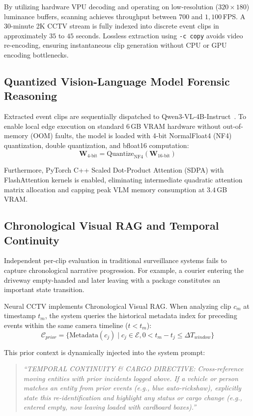 \documentclass[10pt, conference]{IEEEtran}
\begin{document}
By utilizing hardware VPU decoding and operating on low-resolution ($320 \times 180$) luminance buffers, scanning achieves throughput between $700$ and $1,100$\,FPS. A 30-minute 2K CCTV stream is fully indexed into discrete event clips in approximately $35$ to $45$ seconds. Lossless extraction using \texttt{-c copy} avoids video re-encoding, ensuring instantaneous clip generation without CPU or GPU encoding bottlenecks.

\subsection{Quantized Vision-Language Model Forensic Reasoning}
Extracted event clips are sequentially dispatched to Qwen3-VL-4B-Instruct~\cite{bai2023qwen}. To enable local edge execution on standard 6\,GB VRAM hardware without out-of-memory (OOM) faults, the model is loaded with 4-bit NormalFloat4 (NF4) quantization, double quantization, and bfloat16 computation:
\begin{equation}
\label{eq:quant}
\mathbf{W}_{4\text{-bit}} = \text{Quantize}_{\text{NF4}}(\mathbf{W}_{16\text{-bit}})
\end{equation}

Furthermore, PyTorch C++ Scaled Dot-Product Attention (SDPA) with FlashAttention kernels is enabled, eliminating intermediate quadratic attention matrix allocation and capping peak VLM memory consumption at $3.4$\,GB VRAM.

\subsection{Chronological Visual RAG and Temporal Continuity}
Independent per-clip evaluation in traditional surveillance systems fails to capture chronological narrative progression. For example, a courier entering the driveway empty-handed and later leaving with a package constitutes an important state transition. 

Neural CCTV implements Chronological Visual RAG. When analyzing clip $c_m$ at timestamp $t_m$, the system queries the historical metadata index for preceding events within the same camera timeline ($t < t_m$):
\begin{equation}
\label{eq:rag_context}
\mathcal{C}_{prior} = \{ \text{Metadata}(c_j) \mid c_j \in \mathcal{E}, 0 < t_m - t_j \le \Delta T_{window} \}
\end{equation}

This prior context is dynamically injected into the system prompt:
\begin{quote}
\scriptsize
\textit{``TEMPORAL CONTINUITY \& CARGO DIRECTIVE: Cross-reference moving entities with prior incidents logged above. If a vehicle or person matches an entity from prior events (e.g., blue auto-rickshaw), explicitly state this re-identification and highlight any status or cargo change (e.g., entered empty, now leaving loaded with cardboard boxes).''}
\end{quote}
\end{document}
